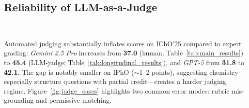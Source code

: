 \documentclass[11pt]{article}
\begin{document}
\subsection{Reliability of LLM-as-a-Judge}~\label{sec:test-eval-type}

Automated judging substantially inflates scores on IChO'25 compared to expert grading:
\emph{Gemini 2.5 Pro} increases from \textbf{37.0} (human; Table~\ref{tab:main_results})
to \textbf{45.4} (LLM-judge; Table~\ref{tab:longitudinal_results}), and \emph{GPT-5} from
\textbf{31.8} to \textbf{42.1}. The gap is notably smaller on IPhO ($\sim$1--2 points),
suggesting chemistry—especially structure questions with partial credit—creates a harder judging regime.
Figure~\ref{fig:judge_cases} highlights two common error modes: rubric mis-grounding and permissive matching.
\vspace{-0.3em}
\end{document}
